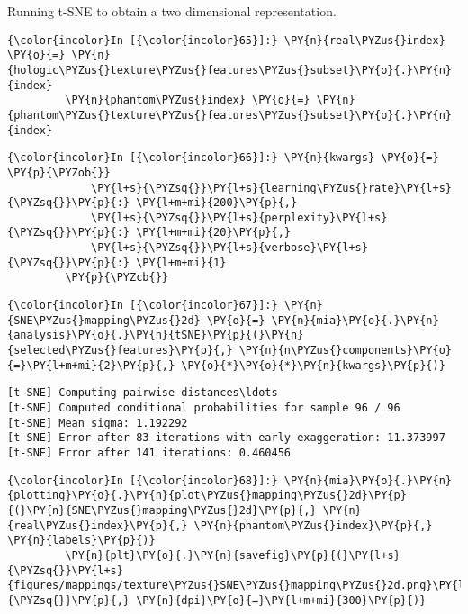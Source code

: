 Running t-SNE to obtain a two dimensional representation.

    \begin{Verbatim}[commandchars=\\\{\}]
{\color{incolor}In [{\color{incolor}65}]:} \PY{n}{real\PYZus{}index} \PY{o}{=} \PY{n}{hologic\PYZus{}texture\PYZus{}features\PYZus{}subset}\PY{o}{.}\PY{n}{index}
         \PY{n}{phantom\PYZus{}index} \PY{o}{=} \PY{n}{phantom\PYZus{}texture\PYZus{}features\PYZus{}subset}\PY{o}{.}\PY{n}{index}
\end{Verbatim}

    \begin{Verbatim}[commandchars=\\\{\}]
{\color{incolor}In [{\color{incolor}66}]:} \PY{n}{kwargs} \PY{o}{=} \PY{p}{\PYZob{}}
             \PY{l+s}{\PYZsq{}}\PY{l+s}{learning\PYZus{}rate}\PY{l+s}{\PYZsq{}}\PY{p}{:} \PY{l+m+mi}{200}\PY{p}{,}
             \PY{l+s}{\PYZsq{}}\PY{l+s}{perplexity}\PY{l+s}{\PYZsq{}}\PY{p}{:} \PY{l+m+mi}{20}\PY{p}{,}
             \PY{l+s}{\PYZsq{}}\PY{l+s}{verbose}\PY{l+s}{\PYZsq{}}\PY{p}{:} \PY{l+m+mi}{1}
         \PY{p}{\PYZcb{}}
\end{Verbatim}

    \begin{Verbatim}[commandchars=\\\{\}]
{\color{incolor}In [{\color{incolor}67}]:} \PY{n}{SNE\PYZus{}mapping\PYZus{}2d} \PY{o}{=} \PY{n}{mia}\PY{o}{.}\PY{n}{analysis}\PY{o}{.}\PY{n}{tSNE}\PY{p}{(}\PY{n}{selected\PYZus{}features}\PY{p}{,} \PY{n}{n\PYZus{}components}\PY{o}{=}\PY{l+m+mi}{2}\PY{p}{,} \PY{o}{*}\PY{o}{*}\PY{n}{kwargs}\PY{p}{)}
\end{Verbatim}

    \begin{Verbatim}[commandchars=\\\{\}]
[t-SNE] Computing pairwise distances\ldots
[t-SNE] Computed conditional probabilities for sample 96 / 96
[t-SNE] Mean sigma: 1.192292
[t-SNE] Error after 83 iterations with early exaggeration: 11.373997
[t-SNE] Error after 141 iterations: 0.460456
    \end{Verbatim}

    \begin{Verbatim}[commandchars=\\\{\}]
{\color{incolor}In [{\color{incolor}68}]:} \PY{n}{mia}\PY{o}{.}\PY{n}{plotting}\PY{o}{.}\PY{n}{plot\PYZus{}mapping\PYZus{}2d}\PY{p}{(}\PY{n}{SNE\PYZus{}mapping\PYZus{}2d}\PY{p}{,} \PY{n}{real\PYZus{}index}\PY{p}{,} \PY{n}{phantom\PYZus{}index}\PY{p}{,} \PY{n}{labels}\PY{p}{)}
         \PY{n}{plt}\PY{o}{.}\PY{n}{savefig}\PY{p}{(}\PY{l+s}{\PYZsq{}}\PY{l+s}{figures/mappings/texture\PYZus{}SNE\PYZus{}mapping\PYZus{}2d.png}\PY{l+s}{\PYZsq{}}\PY{p}{,} \PY{n}{dpi}\PY{o}{=}\PY{l+m+mi}{300}\PY{p}{)}
\end{Verbatim}

